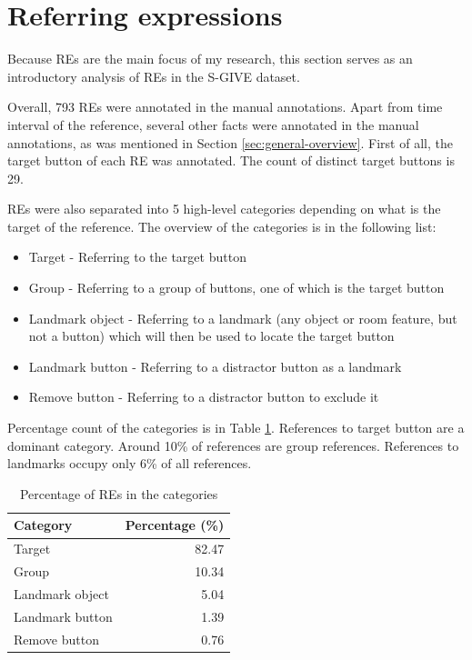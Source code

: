 \section{Referring expressions}
Because REs are the main focus of my research, this section serves as an introductory analysis of REs in the S-GIVE dataset.

Overall, 793 REs were annotated in the manual annotations. Apart from time interval of the reference, several other facts were annotated in the manual annotations, as was mentioned in Section \ref{sec:general-overview}. First of all, the target button of each RE was annotated. The count of distinct target buttons is 29.  

REs were also separated into 5 high-level categories depending on what is the target of the reference. The  overview of the categories is in the following list:

\begin{itemize}
\item
Target - Referring to the target button
\item
Group - Referring to a group of buttons, one of which is the target button
\item
Landmark object - Referring to a landmark (any object or room feature, but not a button) which will then be used to locate the target button
\item
Landmark button - Referring to a distractor button as a landmark
\item
Remove button -  Referring to a distractor button to exclude it
\end{itemize}

Percentage count of the categories is in Table \ref{tab:res-groups}. References to target button are a dominant category. Around 10\% of references are group references. References to landmarks occupy only 6\% of all references.

\begin{table}[h!]
\centering
\begin{tabular}{lr}
\toprule
Category  & Percentage (\%)  \\
\midrule
Target   		& 82.47\\
Group 			& 10.34\\
Landmark object 	& 5.04\\
Landmark button	& 1.39\\
Remove button 	& 0.76\\
\bottomrule
\end{tabular}
\caption{Percentage of REs in the categories}
\label{tab:res-groups}
\end{table} 

